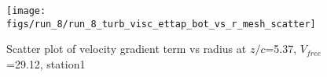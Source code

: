 \begin{figure}[H]
\centering
\texttt{[image: figs/run\_8/run\_8\_turb\_visc\_ettap\_bot\_vs\_r\_mesh\_scatter]}
\caption{Scatter plot of velocity gradient term vs radius at $z/c$=5.37, $V_{free}$=29.12, station1}
\label{fig:run_8_turb_visc_ettap_bot_vs_r_mesh_scatter}
\end{figure}


